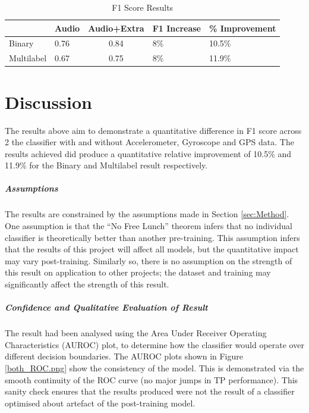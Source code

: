 \documentclass{UoNMCHA}
\newcommand{\inlineQuote}[1]{``#1''}
\newcommand{\fref}[1] {Figure \ref{#1}}
\newcommand{\sref}[1] {Section \ref{#1}}
\numberwithin{equation}{section}
\begin{document}
\begin{table}[h]
    \begin{center}  
        \caption{F1 Score Results}\label{tab:F1Results}
    \begin{tabular}{llcll}
    \hline\hline 
    & Audio & \multicolumn{1}{l}{Audio+Extra} & F1 Increase & \% Improvement \\
    \hline 
    Binary     & 0.76  & 0.84                            & 8\%    & 10.5\%        \\
    Multilabel & 0.67  & 0.75                            & 8\%    & 11.9\%        \\   
    \hline                        
    \end{tabular}
    \end{center} 
\end{table}


\clearpage \section{Discussion}\label{sec:Discussion}
The results above aim to demonstrate a quantitative difference in F1 score across 2 the classifier with and without Accelerometer, Gyroscope and GPS data. The results achieved did produce a quantitative relative improvement of 10.5\% and 11.9\% for the Binary and Multilabel result respectively.

\subparagraph{Assumptions}
The results are constrained by the assumptions made in \sref{sec:Method}. One assumption is that the \inlineQuote{No Free Lunch} theorem infers that no individual classifier is theoretically better than another pre-training. This assumption infers that the results of this project will affect all models, but the quantitative impact may vary post-training. Similarly so, there is no assumption on the strength of this result on application to other projects; the dataset and training may significantly affect the strength of this result.

\subparagraph{Confidence and Qualitative Evaluation of Result}
The result had been analysed using the Area Under Receiver Operating Characteristics (AUROC) plot, to determine how the classifier would operate over different decision boundaries. The AUROC plots shown in \fref{both_ROC.png} show the consistency of the model. This is demonstrated via the smooth continuity of the ROC curve (no major jumps in TP performance). This sanity check ensures that the results produced were not the result of a classifier optimised about artefact of the post-training model.
\end{document}
